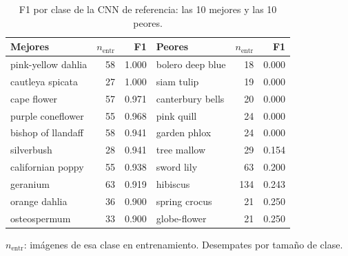 \begin{table}[htbp]
\centering
\caption{F1 por clase de la CNN de referencia: las 10 mejores y las 10 peores.}
\label{tab:clases}
\small
\begin{tabular}{lrrlrr}
\toprule
Mejores & $n_{\text{entr}}$ & F1 & Peores & $n_{\text{entr}}$ & F1 \\
\midrule
pink-yellow dahlia & 58 & 1.000 & bolero deep blue & 18 & 0.000 \\
cautleya spicata & 27 & 1.000 & siam tulip & 19 & 0.000 \\
cape flower & 57 & 0.971 & canterbury bells & 20 & 0.000 \\
purple coneflower & 55 & 0.968 & pink quill & 24 & 0.000 \\
bishop of llandaff & 58 & 0.941 & garden phlox & 24 & 0.000 \\
silverbush & 28 & 0.941 & tree mallow & 29 & 0.154 \\
californian poppy & 55 & 0.938 & sword lily & 63 & 0.200 \\
geranium & 63 & 0.919 & hibiscus & 134 & 0.243 \\
orange dahlia & 36 & 0.900 & spring crocus & 21 & 0.250 \\
osteospermum & 33 & 0.900 & globe-flower & 21 & 0.250 \\
\bottomrule
\end{tabular}
\par\smallskip
\parbox{0.95\textwidth}{\footnotesize $n_{\text{entr}}$: imágenes de esa clase en entrenamiento. Desempates por tamaño de clase.}
\end{table}
